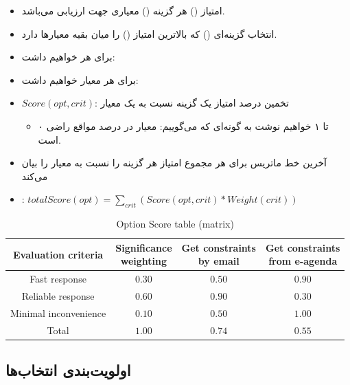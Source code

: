 \begin{itemize}
    \item امتیاز () هر گزینه () معیاری جهت ارزیابی می‌باشد.
    \item انتخاب گزینه‌ای () که بالاترین امتیاز () را میان
    بقیه معیار‌ها دارد.
    \item برای هر  خواهیم داشت: 
    \item برای هر معیار  خواهیم داشت: 
    \item $Score(opt, crit)$: تخمین درصد امتیاز یک گزینه نسبت به یک معیار
    \begin{itemize}
        \item ۰ تا ۱ خواهیم نوشت به گونه‌ای که می‌گوییم: معیار در  درصد
        مواقع راضی است.
    \end{itemize}
    \item آخرین خط ماتریس برای هر  مجموع امتیاز هر گزینه را نسبت به
    معیار را بیان می‌کند
    \item {}: $totalScore(opt) = \sum_{crit}(Score(opt, crit) * Weight(crit))$
\end{itemize}

\begin{LTR}
    \begin{table}[H]
        \centering
        \begin{tabular}{cccc}
            Evaluation criteria & \makecell{Significance \\ weighting} & \makecell{Get constraints \\ by email} & \makecell{Get constraints \\ from e-agenda} \\ \hline
            Fast response & $0.30$ & $0.50$ & $0.90$ \\ \hline
            Reliable response & $0.60$ & $0.90$ & $0.30$ \\ \hline
            Minimal inconvenience & $0.10$ & $0.50$ & $1.00$ \\ \hline
            Total & $1.00$ & $0.74$ & $0.55$ \\
        \end{tabular}
        \caption{Option Score table (matrix)}
        \label{fig:optionScore}
    \end{table}
\end{LTR}

\subsection{اولویت‌بندی انتخاب‌ها}

